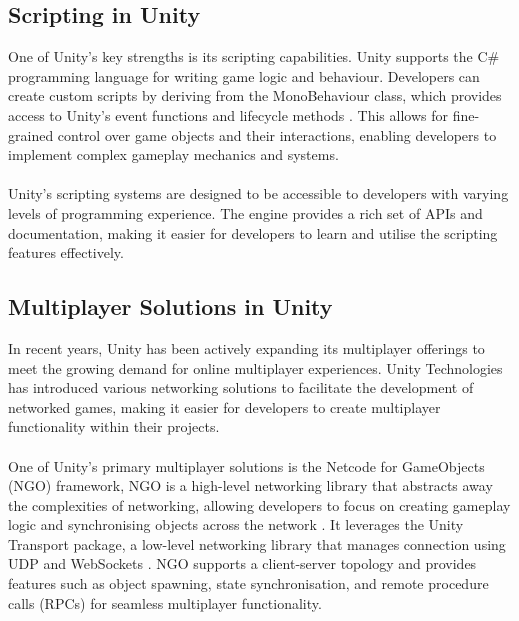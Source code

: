 \subsection{Scripting in Unity}
One of Unity's key strengths is its scripting capabilities. Unity supports the C\# programming language for writing game logic and behaviour. Developers can create custom scripts by deriving from the MonoBehaviour class, which provides access to Unity's event functions and lifecycle methods \cite{Unity-Tech2022.3a}. This allows for fine-grained control over game objects and their interactions, enabling developers to implement complex gameplay mechanics and systems.
\\
\noindent
\\
Unity's scripting systems are designed to be accessible to developers with varying levels of programming experience. The engine provides a rich set of APIs and documentation, making it easier for developers to learn and utilise the scripting features effectively.

\subsection{Multiplayer Solutions in Unity}
In recent years, Unity has been actively expanding its multiplayer offerings to meet the growing demand for online multiplayer experiences. Unity Technologies has introduced various networking solutions to facilitate the development of networked games, making it easier for developers to create multiplayer functionality within their projects.
\\
\noindent
\\
One of Unity's primary multiplayer solutions is the Netcode for GameObjects (NGO) framework, NGO is a high-level networking library that abstracts away the complexities of networking, allowing developers to focus on creating gameplay logic and synchronising objects across the network \cite{Unity-NGO}. It leverages the Unity Transport package, a low-level networking library that manages connection using UDP and WebSockets \cite{Unity-Transport}. NGO supports a client-server topology and provides features such as object spawning, state synchronisation, and remote procedure calls (RPCs) for seamless multiplayer functionality.

